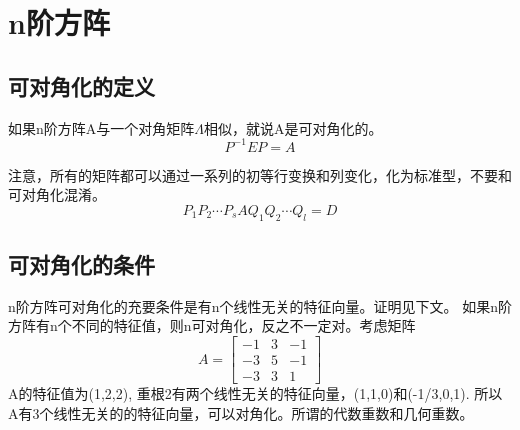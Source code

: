 \documentclass[]{article}
\begin{document}
\section{n阶方阵}
\subsection{可对角化的定义}
如果n阶方阵A与一个对角矩阵$\Lambda$相似，就说A是可对角化的。
\[ P^{-1}EP = A  \]

注意，所有的矩阵都可以通过一系列的初等行变换和列变化，化为标准型，不要和可对角化混淆。
\[ P_1 P_2\cdots P_s A Q_1 Q_2 \cdots Q_l = D \]

\subsection{可对角化的条件}
n阶方阵可对角化的充要条件是有n个线性无关的特征向量。证明见下文。
如果n阶方阵有n个不同的特征值，则n可对角化，反之不一定对。考虑矩阵
\begin{equation}
A = 
\begin{bmatrix}
-1 & 3 & -1 \\
-3 & 5 & -1 \\
-3 & 3 & 1
\end{bmatrix}
\end{equation}
A的特征值为(1,2,2), 重根2有两个线性无关的特征向量，(1,1,0)和(-1/3,0,1). 所以A有3个线性无关的的特征向量，可以对角化。所谓的代数重数和几何重数。
\end{document}
